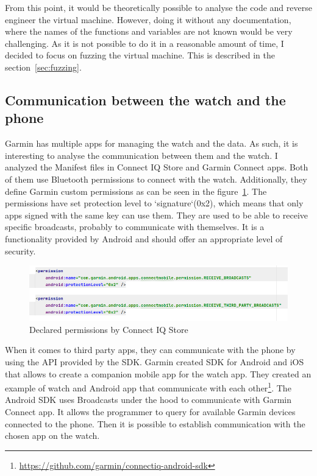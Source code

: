 From this point, it would be theoretically possible to analyse the code and reverse engineer the virtual machine.
However, doing it without any documentation, where the names of the functions and variables are not known would be very challenging.
As it is not possible to do it in a reasonable amount of time, I decided to focus on fuzzing the virtual machine.
This is described in the section~\ref{sec:fuzzing}.

\subsection{Communication between the watch and the phone} \label{subsec:communication-watch-phone}

Garmin has multiple apps for managing the watch and the data.
As such, it is interesting to analyse the communication between them and the watch.
I analyzed the Manifest files in Connect IQ Store and Garmin Connect apps.
Both of them use Bluetooth permissions to connect with the watch.
Additionally, they define Garmin custom permissions as can be seen in the figure~\ref{fig:connect-iq-store-permissions}.
The permissions have set protection level to `signature`(0x2), which means that only apps signed with the same key can use them.
They are used to be able to receive specific broadcasts, probably to communicate with themselves.
It is a functionality provided by Android and should offer an appropriate level of security.

\begin{figure}[h]
    \centering
    \includegraphics[width=1\linewidth]{../../images/android-declared-permissions}
    \caption{Declared permissions by Connect IQ Store}
    \label{fig:connect-iq-store-permissions}
\end{figure}

When it comes to third party apps, they can communicate with the phone by using the API provided by the SDK\@.
Garmin created SDK for Android and iOS that allows to create a companion mobile app for the watch app.
They created an example of watch and Android app that communicate with each other\footnote{\url{https://github.com/garmin/connectiq-android-sdk}}.
The Android SDK uses Broadcasts under the hood to communicate with Garmin Connect app.
It allows the programmer to query for available Garmin devices connected to the phone.
Then it is possible to establish communication with the chosen app on the watch.

